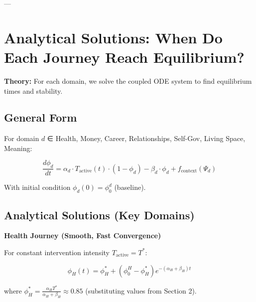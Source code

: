 ---


\section{Analytical Solutions: When Do Each Journey Reach Equilibrium?}
\label{sec:system-dynamics}

\textbf{Theory:} For each domain, we solve the coupled ODE system to find equilibrium times and stability.

\subsection{General Form}

For domain $d$ ∈ {Health, Money, Career, Relationships, Self-Gov, Living Space, Meaning}:

\begin{equation}
\frac{d\phi_d}{dt} = \alpha_d \cdot T_{\text{active}}(t) \cdot (1 - \phi_d) - \beta_d \cdot \phi_d + f_{\text{context}}(\Psi_d)
\end{equation}

With initial condition $\phi_d(0) = \phi_0^d$ (baseline).

\subsection{Analytical Solutions (Key Domains)}

\textbf{Health Journey (Smooth, Fast Convergence)}

For constant intervention intensity $T_{\text{active}} = T^*$:

\begin{equation}
\phi_H(t) = \phi^*_H + \left(\phi_0^H - \phi^*_H\right) e^{-(\alpha_H + \beta_H)t}
\end{equation}

where $\phi^*_H = \frac{\alpha_H T^*}{\alpha_H + \beta_H} \approx 0.85$ (substituting values from Section 2).

